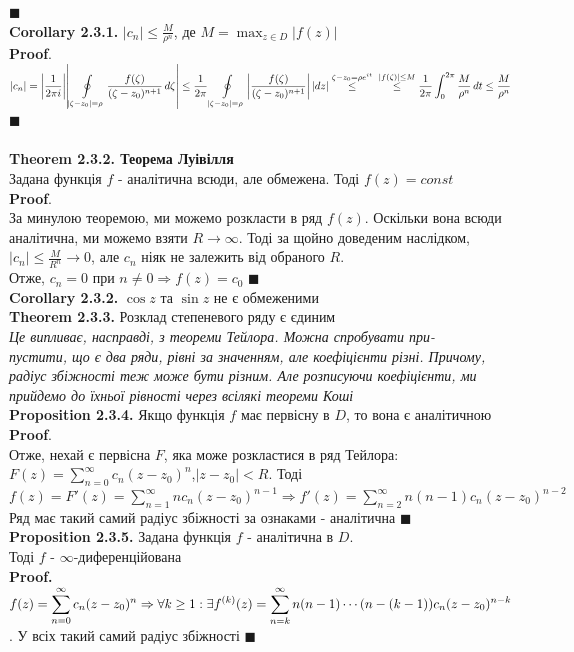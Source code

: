 \documentclass[a4paper, 14pt]{extarticle}
\def\hugespace{\vspace{5mm} \\}
\begin{document}
	 $\blacksquare$
	 \hugespace
	 \textbf{Corollary 2.3.1.} $\displaystyle |c_n| \leq \frac{M}{\rho^n}$, де $\displaystyle M=\max_{z\in D} |f(z)|$\\
	 \textbf{Proof}.\\
	 $\displaystyle |c_n| = \abs{\frac{1}{2\pi i}} \abs{\oint\displaylimits_{|\zeta-z_0|=\rho} \frac{f(\zeta)}{(\zeta-z_0)^{n+1}}\,d\zeta} \leq \frac{1}{2\pi} \oint\displaylimits_{|\zeta-z_0|=\rho} \abs{\frac{f(\zeta)}{(\zeta-z_0)^{n+1}}}\,\abs{dz} \overset{\zeta-z_0= \rho e^{it}}{\leq} \\ \overset{|f(\zeta)| \leq M}{\leq} \frac{1}{2\pi} \int_{0}^{2 \pi} \frac{M}{\rho^n}\,dt \leq \frac{M}{\rho^n}$ $\blacksquare$\\
	\hugespace
	
	\textbf{Theorem 2.3.2. Теорема Луівілля}\\
	Задана функція $f$ - аналітична всюди, але обмежена. Тоді $f(z)=const$\\
	\textbf{Proof}.\\
	За минулою теоремою, ми можемо розкласти в ряд $f(z)$. Оскільки вона всюди аналітична, ми можемо взяти $R\rightarrow \infty$. Тоді за щойно доведеним наслідком, $\displaystyle |c_n| \leq \frac{M}{R^n} \rightarrow 0$, але $c_n$ ніяк не залежить від обраного $R$.\\
	Отже, $c_n=0$ при $n \neq 0 \Rightarrow f(z)=c_0$ $\blacksquare$
	\hugespace
	\textbf{Corollary 2.3.2.} $\cos z$ та $\sin z$ не є обмеженими
	\hugespace
	\textbf{Theorem 2.3.3.} Розклад степеневого ряду є єдиним\\
	\textit{Це випливає, насправді, з теореми Тейлора. Можна спробувати при-\\пустити, що є два ряди, рівні за значенням, але коефіцієнти різні. Причому, радіус збіжності теж може бути різним. Але розписуючи коефіцієнти, ми прийдемо до їхньої рівності через всілякі теореми Коші}
	\hugespace
	\textbf{Proposition 2.3.4.} Якщо функція $f$ має первісну в $D$, то вона є аналітичною
	\textbf{Proof}.\\
	Отже, нехай є первісна $F$, яка може розкластися в ряд Тейлора:\\
	$\displaystyle F(z)=\sum_{n=0}^{\infty} c_n(z-z_0)^n$,$|z-z_0|<R$. Тоді\\ $\displaystyle f(z)=F'(z)=\sum_{n=1}^{\infty} nc_n(z-z_0)^{n-1} \Rightarrow f'(z) = \sum_{n=2}^{\infty} n(n-1)c_n(z-z_0)^{n-2}$\\
	Ряд має такий самий радіус збіжності за ознаками - аналітична $\blacksquare$
	\hugespace
	\textbf{Proposition 2.3.5.} Задана функція $f$ - аналітична в $D$.\\Тоді $f$ - $\infty$-диференційована\\
	\textbf{Proof.}\\
	$\displaystyle f(z)=\sum_{n=0}^{\infty} c_n(z-z_0)^n \Rightarrow \\ \forall k\geq1: \exists f^{(k)}(z) = \sum_{n=k}^{\infty} n(n-1) \cdots (n-(k-1))c_n(z-z_0)^{n-k}$. У всіх такий самий радіус збіжності $\blacksquare$
	\hugespace
	
\end{document}
